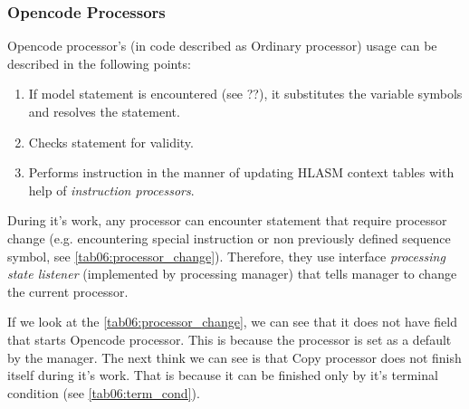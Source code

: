 \subsubsection{Opencode Processors}

Opencode processor's (in code described as Ordinary processor) usage can be described in the following points:
\begin{enumerate}
	\item If model statement is encountered (see ??), it substitutes the variable symbols and resolves the statement.
	\item Checks statement for validity.
	\item Performs instruction in the manner of updating HLASM context tables with help of \emph{instruction processors}.
\end{enumerate}

\vspace{0.5cm}

During it's work, any processor can encounter statement that require processor change (e.g. encountering special instruction or non previously defined sequence symbol, see \cref{tab06:processor_change}). Therefore, they use interface \emph{processing state listener} (implemented by processing manager) that tells manager to change the current processor.

If we look at the \cref{tab06:processor_change}, we can see that it does not have field that starts Opencode processor. This is because the processor is set as a default by the manager. The next think we can see is that Copy processor does not finish itself during it's work. That is because it  can be finished only by it's terminal condition (see \cref{tab06:term_cond}). 

